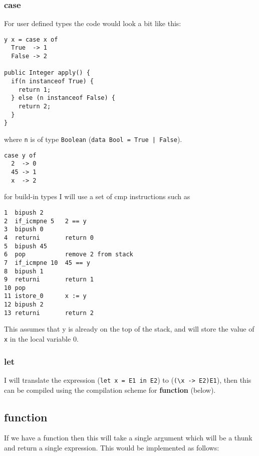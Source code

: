 \documentclass[12pt,a4paper,twoside]{article}
\begin{document}
\subsubsection{case}



For user defined types the code would look a bit like this:

\begin{verbatim}
y x = case x of
  True  -> 1
  False -> 2

public Integer apply() {
  if(n instanceof True) {
    return 1;
  } else (n instanceof False) {
    return 2;
  }
}
\end{verbatim}

where \texttt{n} is of type \texttt{Boolean} (\texttt{data Bool = True | False}).


\begin{verbatim}
case y of
  2  -> 0
  45 -> 1
  x  -> 2
\end{verbatim}

for build-in types I will use a set of cmp instructions such as

\begin{verbatim}
1  bipush 2       
2  if_icmpne 5   2 == y
3  bipush 0      
4  returni       return 0
5  bipush 45
6  pop           remove 2 from stack
7  if_icmpne 10  45 == y
8  bipush 1    
9  returni       return 1
10 pop
11 istore_0      x := y
12 bipush 2      
13 returni       return 2
\end{verbatim}

This assumes that y is already on the top of the stack, and will store the value of \texttt{x} in the local
variable 0.

\subsubsection{let} 

I will translate the expression (\texttt{let x = E1 in E2}) to (\texttt{(\textbackslash x -> E2)E1}), then 
this can be compiled using the compilation scheme for \textbf{function} (below).

\subsection{function}

If we have a function then this will take a single argument which will be a thunk and return a single expression. 
This would be implemented as follows:
\end{document}

